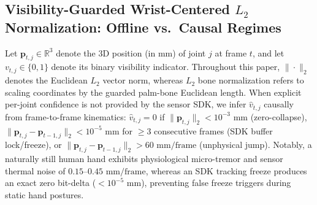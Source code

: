 \documentclass[10pt,twocolumn]{article}
\begin{document}
\subsection{Visibility-Guarded Wrist-Centered $L_2$ Normalization: Offline vs.\ Causal Regimes}
Let $\mathbf{p}_{t,j} \in \mathbb{R}^3$ denote the 3D position (in mm) of joint $j$ at frame $t$, and let $v_{t,j} \in \{0,1\}$ denote its binary visibility indicator. Throughout this paper, $\|\cdot\|_2$ denotes the Euclidean $L_2$ vector norm, whereas $L_2$ bone normalization refers to scaling coordinates by the guarded palm-bone Euclidean length. When explicit per-joint confidence is not provided by the sensor SDK, we infer $\hat{v}_{t,j}$ causally from frame-to-frame kinematics: $\hat{v}_{t,j} = 0$ if $\|\mathbf{p}_{t,j}\|_2 < 10^{-3}\text{ mm}$ (zero-collapse), $\|\mathbf{p}_{t,j} - \mathbf{p}_{t-1,j}\|_2 < 10^{-5}\text{ mm}$ for $\ge 3$ consecutive frames (SDK buffer lock/freeze), or $\|\mathbf{p}_{t,j} - \mathbf{p}_{t-1,j}\|_2 > 60\text{ mm/frame}$ (unphysical jump). Notably, a naturally still human hand exhibits physiological micro-tremor and sensor thermal noise of $0.15\text{--}0.45\text{ mm/frame}$, whereas an SDK tracking freeze produces an exact zero bit-delta ($<10^{-5}\text{ mm}$), preventing false freeze triggers during static hand postures.
\end{document}
